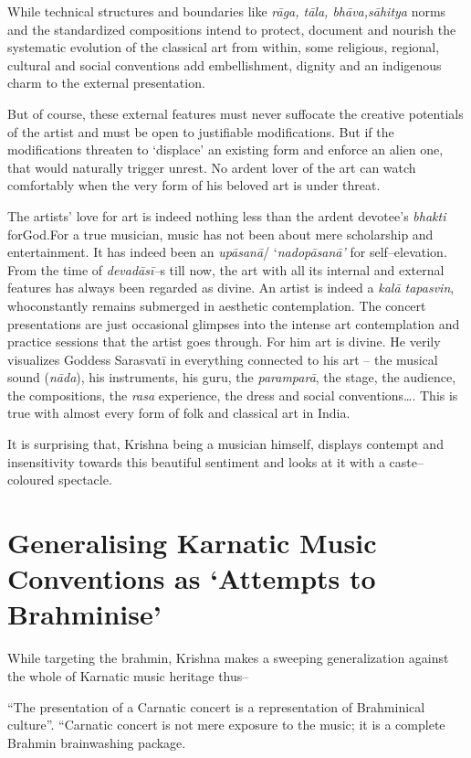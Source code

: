 While technical structures and boundaries like \textit{rāga, tāla, bhāva,}\textit{sāhitya} norms and the standardized compositions intend to protect, document and nourish the systematic evolution of the classical art from within, some religious, regional, cultural and social conventions add embellishment, dignity and an indigenous charm to the external presentation.

But of course, these external features must never suffocate the creative potentials of the artist and must be open to justifiable modifications. But if the modifications threaten to ‘displace’ an existing form and enforce an alien one, that would naturally trigger unrest. No ardent lover of the art can watch comfortably when the very form of his beloved art is under threat.

The artists’ love for art is indeed nothing less than the ardent devotee’s \textit{bhakti} forGod.For a true musician, music has not been about mere scholarship and entertainment. It has indeed been an \textit{upāsanā}/ ‘\textit{nadopāsanā’} for self–elevation. From the time of \textit{devadāsī–}s till now, the art with all its internal and external features has always been regarded as divine. An artist is indeed a \textit{kalā tapasvin}, whoconstantly remains submerged in aesthetic contemplation. The concert presentations are just occasional glimpses into the intense art contemplation and practice sessions that the artist goes through. For him art is divine. He verily visualizes Goddess Sarasvatī in everything connected to his art – the musical sound (\textit{nāda}), his instruments, his guru, the \textit{paramparā}, the stage, the audience, the compositions, the \textit{rasa} experience, the dress and social conventions…. This is true with almost every form of folk and classical art in India.

It is surprising that, Krishna being a musician himself, displays contempt and insensitivity towards this beautiful sentiment and looks at it with a caste–coloured spectacle.


\section*{Generalising Karnatic Music Conventions as ‘Attempts to Brahminise’}

While targeting the brahmin, Krishna makes a sweeping generalization against the whole of Karnatic music heritage thus–

\begin{myquote}
“The presentation of a Carnatic concert is a representation of Brahminical culture”. “Carnatic concert is not mere exposure to the music; it is a complete Brahmin brainwashing package.
\end{myquote}

